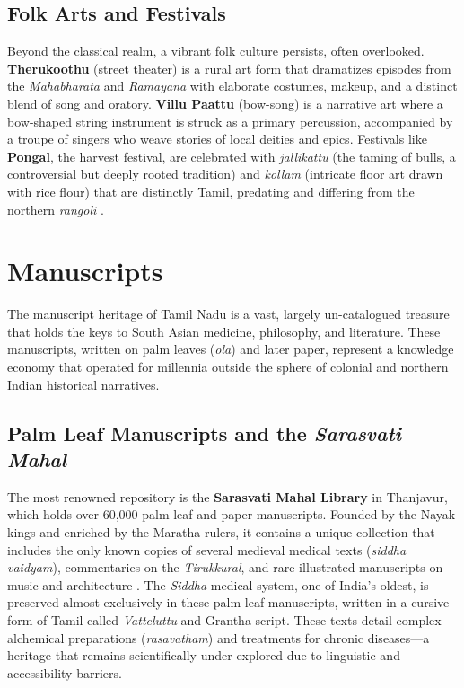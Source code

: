 \documentclass[12pt]{article}
\begin{document}
\subsection{Folk Arts and Festivals}
Beyond the classical realm, a vibrant folk culture persists, often overlooked. \textbf{Therukoothu} (street theater) is a rural art form that dramatizes episodes from the \textit{Mahabharata} and \textit{Ramayana} with elaborate costumes, makeup, and a distinct blend of song and oratory. \textbf{Villu Paattu} (bow-song) is a narrative art where a bow-shaped string instrument is struck as a primary percussion, accompanied by a troupe of singers who weave stories of local deities and epics. Festivals like \textbf{Pongal}, the harvest festival, are celebrated with \textit{jallikattu} (the taming of bulls, a controversial but deeply rooted tradition) and \textit{kollam} (intricate floor art drawn with rice flour) that are distinctly Tamil, predating and differing from the northern \textit{rangoli} \cite{blackburn1988}.

\section{Manuscripts}
The manuscript heritage of Tamil Nadu is a vast, largely un-catalogued treasure that holds the keys to South Asian medicine, philosophy, and literature. These manuscripts, written on palm leaves (\textit{ola}) and later paper, represent a knowledge economy that operated for millennia outside the sphere of colonial and northern Indian historical narratives.

\subsection{Palm Leaf Manuscripts and the \textit{Sarasvati Mahal}}
The most renowned repository is the \textbf{Sarasvati Mahal Library} in Thanjavur, which holds over 60,000 palm leaf and paper manuscripts. Founded by the Nayak kings and enriched by the Maratha rulers, it contains a unique collection that includes the only known copies of several medieval medical texts (\textit{siddha vaidyam}), commentaries on the \textit{Tirukkural}, and rare illustrated manuscripts on music and architecture \cite{seshagiri2003}. The \textit{Siddha} medical system, one of India's oldest, is preserved almost exclusively in these palm leaf manuscripts, written in a cursive form of Tamil called \textit{Vatteluttu} and Grantha script. These texts detail complex alchemical preparations (\textit{rasavatham}) and treatments for chronic diseases—a heritage that remains scientifically under-explored due to linguistic and accessibility barriers.
\end{document}
